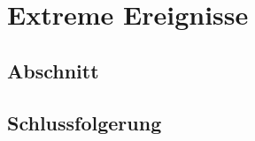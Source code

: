 %
%
%
\chapter{Extreme Ereignisse\label{chapter:thema}}
\begin{refsection}

\section{Abschnitt}

\section{Schlussfolgerung}

\printbibliography[heading=subbibliography]
\end{refsection}
